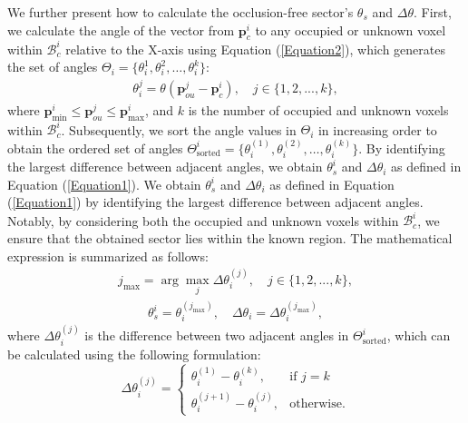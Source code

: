 \documentclass[letterpaper, 10pt, journal, twoside]{support/IEEEtran}
\begin{document}
We further present how to calculate the occlusion-free sector's \( \theta_s \) and \( \Delta\theta \). First, we calculate the angle of the vector from \(\mathbf{p}_c^i\) to any occupied or unknown voxel within \(\mathcal{B}_c^i\) relative to the X-axis using Equation (\ref{Equation2}), which generates the set of angles \(\Theta_i = \{\theta_i^1, \theta_i^2, \dots, \theta_i^{k}\}\):
\begin{equation}
  \label{Equation2}
  \begin{aligned}
    \theta_i^j = \theta(\mathbf{p}_{ou}^j - \mathbf{p}_c^i), \quad j \in \{1, 2, ..., k\},
  \end{aligned}
\end{equation}
where $\mathbf{p}_{\min}^i \leq \mathbf{p}_{ou}^j \leq \mathbf{p}_{\max}^i$, and \(k\) is the number of occupied and unknown voxels within \(\mathcal{B}_c^i\).
Subsequently, we sort the angle values in $\Theta_i$ in increasing order to obtain the ordered set of angles $\Theta_{\text{sorted}}^i = \{ \theta_i^{(1)}, \theta_i^{(2)}, \dots, \theta_i^{(k)} \}$. 
By identifying the largest difference between adjacent angles, we obtain $\theta_s^i$ and $\Delta\theta_i$ as defined in Equation (\ref{Equation1}). 
We obtain $\theta_s^i$ and $\Delta\theta_i$ as defined in Equation (\ref{Equation1}) by identifying the largest difference between adjacent angles.
Notably, by considering both the occupied and unknown voxels within \( \mathcal{B}_c^i \), we ensure that the obtained sector lies within the known region. The mathematical expression is summarized as follows:
\begin{equation}
  \label{Equation3}
  \begin{aligned}
    j_{\max} = \arg\max_j \Delta \theta_i^{(j)},\quad j \in \{1, 2, ..., k\},
  \end{aligned}
\end{equation}
\begin{equation}
  \label{Equation4}
  \begin{aligned}
    \theta_s^i = \theta_i^{(j_{\max})}, \quad \Delta\theta_i = \Delta \theta_i^{(j_{\max})},
  \end{aligned}
\end{equation}
where $\Delta \theta_i^{(j)}$ is the difference between two adjacent angles in $\Theta_{\text{sorted}}^i$, which can be calculated using the following formulation:
\begin{equation}
	\label{Equation5}
	\Delta \theta_i^{(j)}=
	\begin{cases} 
		\theta_i^{(1)} - \theta_i^{(k)}, & \text{if } j=k \\
		\theta_i^{(j+1)} - \theta_i^{(j)}, & \text{otherwise}.
	\end{cases}
\end{equation}
\end{document}
